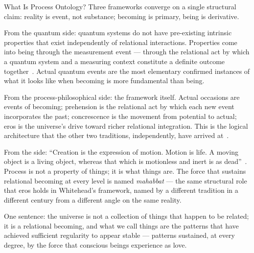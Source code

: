 \begin{convergencemoment}{What Is Process Ontology?}
Three frameworks converge on a single structural claim: reality is event,
not substance; becoming is primary, being is derivative.

From the quantum side: quantum systems do not have pre-existing intrinsic
properties that exist independently of relational interactions.
Properties come into being through the measurement event --- through the
relational act by which a quantum system and a measuring context
constitute a definite outcome together~\citeyearpar{Bell1964,Rovelli1996}.
Actual quantum events are the most elementary confirmed instances of what
it looks like when becoming is more fundamental than being.

From the process-philosophical side: the framework itself. Actual occasions
are events of becoming; prehension is the relational act by which each new
event incorporates the past; concrescence is the movement from potential to
actual; eros is the universe's drive toward richer relational integration.
This is the logical architecture that the other two traditions,
independently, have arrived at~\citeyearpar{Whitehead1929}.

From the \bahai side: ``Creation is the expression of motion. Motion is life.
A moving object is a living object, whereas that which is motionless and
inert is as dead''~\citep[Talk~52]{PUP}.
Process is not a property of things; it is what things are.
The force that sustains relational becoming at every level is named
\textit{mahabbat} --- the same structural role that eros holds in
Whitehead's framework, named by a different tradition in a different century
from a different angle on the same reality.

One sentence: the universe is not a collection of things that happen to be
related; it is a relational becoming, and what we call things are the
patterns that have achieved sufficient regularity to appear stable
--- patterns sustained, at every degree, by the force that conscious beings
experience as love.
\end{convergencemoment}

